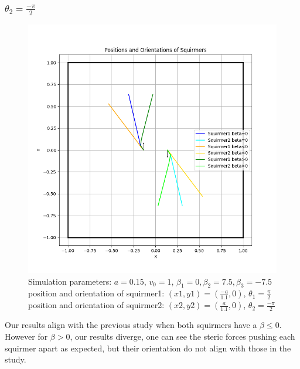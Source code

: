 \documentclass{article}
\begin{document}
\subsubsection{$\theta_2 = \frac{-\pi}{2}$}
\begin{figure}[h]
   \centering
   \includegraphics[width=1\textwidth]{graphs/simulations/twosquirmerinter/sq2.-pi.2.png}
   \caption{\footnotesize Simulation parameters: $a=0.15$, $v_0=1$, $\beta_1=0, \beta_2=7.5, \beta_3=-7.5$\\
   position and orientation of squirmer1: $(x1,y1)=(\frac{-a}{1.1},0)$, $\theta_1=\frac{\pi}{2}$\\
   position and orientation of squirmer2: $(x2,y2)=(\frac{a}{1.1},0)$, $\theta_2=\frac{-\pi}{2}$}
\end{figure}
Our results align with the previous study when both squirmers have a $\beta \le 0$.\\
However for $\beta > 0$, our results diverge, one can see the steric forces pushing each squirmer apart 
as expected, but their orientation do not align with those in the study.\\

\newpage
\end{document}
